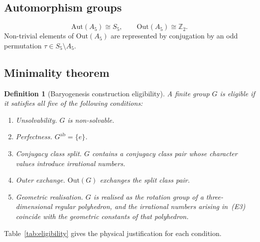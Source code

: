 \documentclass[sn-mathphys-num,Numbered]{sn-jnl}
\theoremstyle{thmstyleone}
\theoremstyle{thmstylethree}
\newtheorem{definition}[theorem]{Definition}
\theoremstyle{thmstyletwo}
\begin{document}
\subsection{Automorphism groups}
\label{ssec:automorphisms}

\begin{equation}
  \mathrm{Aut}(A_5) \cong S_5, \qquad
  \mathrm{Out}(A_5) \cong \mathbb{Z}_2.
  \label{eq:out}
\end{equation}
Non-trivial elements of $\mathrm{Out}(A_5)$ are represented by
conjugation by an odd permutation $\tau \in S_5 \setminus A_5$.

\subsection{Minimality theorem}
\label{ssec:minimality}

\begin{definition}[Baryogenesis construction eligibility]
\label{def:eligible}
A finite group $G$ is \emph{eligible} if it satisfies all five of the
following conditions:
\begin{enumerate}
  \item[(E1)] \textit{Unsolvability.} $G$ is non-solvable.
  \item[(E2)] \textit{Perfectness.} $G^{\mathrm{ab}} = \{e\}$.
  \item[(E3)] \textit{Conjugacy class split.} $G$ contains a conjugacy
    class pair whose character values introduce irrational numbers.
  \item[(E4)] \textit{Outer exchange.} $\mathrm{Out}(G)$ exchanges the
    split class pair.
  \item[(E5)] \textit{Geometric realisation.} $G$ is realised as the
    rotation group of a three-dimensional regular polyhedron, and the
    irrational numbers arising in~(E3) coincide with the geometric
    constants of that polyhedron.
\end{enumerate}
\end{definition}

Table~\ref{tab:eligibility} gives the physical justification for each
condition.
\end{document}
